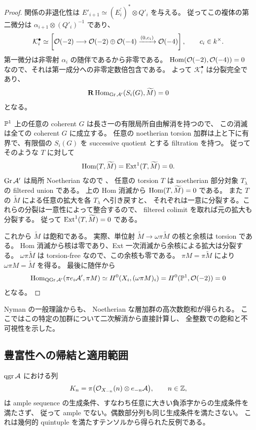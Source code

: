 \begin{proof}
関係の非退化性は
$E'_{i+1}\simeq(E_i^\prime)^*\otimes Q'_i$ を与える。
従ってこの複体の第二微分は
$\alpha_{i+1}\otimes(Q'_i)^{-1}$ であり、
\[
 \mathcal K_i^\bullet\simeq
 \left[
 \mathcal O(-2)\longrightarrow\mathcal O(-2)\oplus\mathcal O(-4)
 \xrightarrow{(0,c_i)}\mathcal O(-4)
 \right],\qquad c_i\in k^\times.
\]
第一微分は非零射 $\alpha_i$ の随伴であるから非零である。
$\operatorname{Hom}(\mathcal O(-2),\mathcal O(-4))=0$ なので、それは第一成分への非零定数倍包含である。
よって $\mathcal K_i^\bullet$ は分裂完全であり、
\[
 \mathbf R\operatorname{Hom}_{\operatorname{Gr}\mathcal A'}(S_i(G),\widetilde M)=0
\]
となる。

$\mathbb P^1$ 上の任意の coherent $G$ は長さ一の有限局所自由解消を持つので、
この消滅は全ての coherent $G$ に成立する。
任意の noetherian torsion 加群は上と下に有界で、有限個の
$S_i(G)$ を successive quotient とする filtration を持つ。
従ってそのような $T$ に対して
\[
 \operatorname{Hom}(T,\widetilde M)=\operatorname{Ext}^1(T,\widetilde M)=0.
\]
$\operatorname{Gr}\mathcal A'$ は局所 Noetherian なので \cite[Theorem 1.2]{VanDenBergh2012P1}、
任意の torsion $T$ は noetherian 部分対象 $T_\lambda$ の filtered union である。
上の Hom 消滅から $\operatorname{Hom}(T,\widetilde M)=0$ である。
また $T$ の $\widetilde M$ による任意の拡大を各 $T_\lambda$ へ引き戻すと、
それぞれは一意に分裂する。これらの分裂は一意性によって整合するので、
filtered colimit を取れば元の拡大も分裂する。
従って $\operatorname{Ext}^1(T,\widetilde M)=0$ である。

これから $\widetilde M$ は飽和である。
実際、単位射 $\widetilde M\to\omega\pi\widetilde M$ の核と余核は torsion である。
Hom 消滅から核は零であり、Ext 一次消滅から余核による拡大は分裂する。
$\omega\pi\widetilde M$ は torsion-free なので、この余核も零である。
$\pi M=\pi\widetilde M$ により $\omega\pi M=\widetilde M$ を得る。
最後に随伴から
\[
 \operatorname{Hom}_{\operatorname{QGr}\mathcal A'}(\pi e_i\mathcal A',\pi M)
 \simeq H^0(X_i,(\omega\pi M)_i)
 =H^0(\mathbb P^1,\mathcal O(-2))=0
\]
となる。
\end{proof}

Nyman \cite[Theorem 2.5, Corollary 3.3]{Nyman2004} の一般理論からも、
Noetherian な層加群の高次数飽和が得られる。
ここではこの特定の加群について二次解消から直接計算し、
全整数での飽和と不可視性を示した。

\subsection{豊富性への帰結と適用範囲}

\begin{theorem}\label{ruled-thm:nonample}
$\operatorname{qgr}\mathcal A$ における列
\[
 K_n=\pi\bigl(\mathcal O_{X_{-n}}(n)\otimes e_{-n}\mathcal A\bigr),\qquad n\in\mathbb Z,
\]
は ample sequence の生成条件、すなわち任意に大きい負添字からの生成条件を満たさず、
従って ample でない。偶数部分列も同じ生成条件を満たさない。
これは幾何的 quintuple を満たすテンソルから得られた反例である。
\end{theorem}

